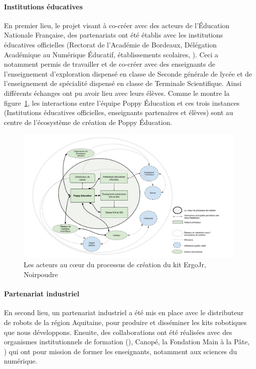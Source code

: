         \paragraph{Institutions éducatives}
            En premier lieu, le projet visant à co-créer avec des acteurs de l'Éducation Nationale Française, des partenariats ont été établis avec les institutions éducatives officielles (Rectorat de l’Académie de Bordeaux, Délégation Académique au Numérique Éducatif, établissements scolaires, \etc).
            Ceci a notamment permis de travailler et de co-créer avec des enseignants de l’enseignement d’exploration  dispensé en classe de Seconde générale de lycée et de l’enseignement de spécialité  dispensé en classe de Terminale Scientifique. Ainsi différents échanges ont pu avoir lieu avec leurs élèves.
            Comme le montre la figure~\ref{fig:acteurs}, les interactions entre l'équipe Poppy Éducation et ces trois instances (Institutions éducatives officielles, enseignants partenaires et élèves) sont au centre de l'écosystème de création de Poppy Éducation.
        \begin{figure}[!h]
          \centering
          \includegraphics[width=\linewidth]{Figures/Noirpoudre-stakeholders.png}
          \caption{Les acteurs au cœur du processus de création du kit ErgoJr, Noirpoudre~\cite{RI}}\label{fig:acteurs}
        \end{figure}
        \paragraph{Partenariat industriel}
            En second lieu, un partenariat industriel a été mis en place avec le distributeur de robots  de la région Aquitaine, pour produire et disséminer les kits robotiques que nous développons.
            Ensuite, des collaborations ont été réalisées avec des organismes institutionnels de formation (\cf {}), Canopé, la Fondation Main à la Pâte, \etc) qui ont pour mission de former les enseignants, notamment aux sciences du numérique.
